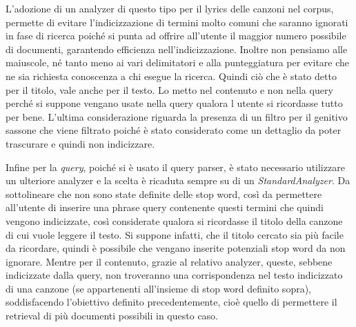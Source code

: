 \documentclass{article}
\begin{document}
L'adozione di un analyzer di questo tipo per il lyrics delle canzoni nel corpus, permette di evitare l'indicizzazione di termini molto comuni che saranno ignorati in fase di ricerca poiché si punta ad offrire all'utente il maggior numero possibile di documenti, garantendo efficienza nell'indicizzazione. Inoltre non pensiamo alle maiuscole, né tanto meno ai vari delimitatori e alla punteggiatura per evitare che ne sia richiesta conoscenza a chi esegue la ricerca. Quindi ciò che è stato detto per il titolo, vale anche per il testo. Lo metto nel contenuto e non nella query perché si suppone vengano usate nella query qualora l utente si ricordasse tutto per bene.
L'ultima considerazione riguarda la presenza di un filtro per il genitivo sassone che viene filtrato poiché è stato considerato come un dettaglio da poter trascurare e quindi non indicizzare.

Infine per la \textit{query}, poiché si è usato il query parser, è stato necessario utilizzare un ulteriore analyzer e la scelta è ricaduta sempre su di un \textit{StandardAnalyzer}.
Da sottolineare che non sono state definite delle stop word, così da permettere all'utente di inserire una phrase query contenente questi termini che quindi vengono indicizzate, così considerate qualora si ricordasse il titolo della canzone di cui vuole leggere il testo. Si suppone infatti, che il titolo cercato sia più facile da ricordare, quindi è possibile che vengano inserite potenziali stop word da non ignorare. Mentre per il contenuto, grazie al relativo analyzer, queste, sebbene indicizzate dalla query, non troveranno una corrispondenza nel testo indicizzato di una canzone (se appartenenti all'insieme di stop word definito sopra), soddisfacendo l'obiettivo definito precedentemente, cioè quello di permettere il retrieval di più documenti possibili in questo caso.
\end{document}
